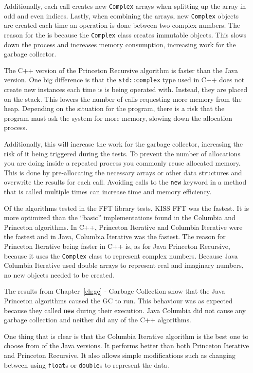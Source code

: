 Additionally, each call creates new \texttt{Complex} arrays when splitting up the array in odd and even indices. Lastly, when combining the arrays, new \texttt{Complex} objects are created each time an operation is done between two complex numbers. The reason for the is because the \texttt{Complex} class creates immutable objects. This slows down the process and increases memory consumption, increasing work for the garbage collector.

The C++ version of the Princeton Recursive algorithm is faster than the Java version. One big difference is that the \texttt{std::complex} type used in C++ does not create new instances each time is is being operated with. Instead, they are placed on the stack. This lowers the number of calls requesting more memory from the heap. Depending on the situation for the program, there is a risk that the program must ask the system for more memory, slowing down the allocation process.

Additionally, this will increase the work for the garbage collector, increasing the risk of it being triggered during the tests. To prevent the number of allocations you are doing inside a repeated process you commonly reuse allocated memory. This is done by pre-allocating the necessary arrays or other data structures and overwrite the results for each call. Avoiding calls to the \texttt{new} keyword in a method that is called multiple times can increase time and memory efficiency.

Of the algorithms tested in the FFT library tests, KISS FFT was the fastest. It is more optimized than the \enquote{basic} implementations found in the Columbia and Princeton algorithms. In C++, Princeton Iterative and Columbia Iterative were the fastest and in Java, Columbia Iterative was the fastest. The reason for Princeton Iterative being faster in C++ is, as for Java Princeton Recursive, because it uses the \texttt{Complex} class to represent complex numbers. Because Java Columbia Iterative used double arrays to represent real and imaginary numbers, no new objects needed to be created.

The results from Chapter~\ref{ch:gc} - Garbage Collection show that the Java Princeton algorithms caused the GC to run. This behaviour was as expected because they called \texttt{new} during their execution. Java Columbia did not cause any garbage collection and neither did any of the C++ algorithms.

One thing that is clear is that the Columbia Iterative algorithm is the best one to choose from of the Java versions. It performs better than both Princeton Iterative and Princeton Recursive. It also allows simple modifications such as changing between using \texttt{float}s or  \texttt{double}s to represent the data.

